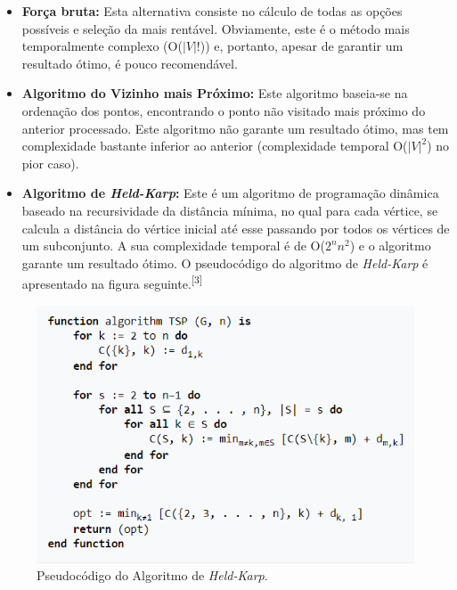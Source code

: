 \documentclass[article, a4paper, 12pt, oneside]{memoir}
\begin{document}
\begin{itemize}
\item \textbf{Força bruta:} Esta alternativa consiste no cálculo de todas as opções possíveis e seleção da mais rentável. Obviamente, este é o método mais temporalmente complexo (O($|V|!$)) e, portanto, apesar de garantir um resultado ótimo, é pouco recomendável.

\item \textbf{Algoritmo do Vizinho mais Próximo:} Este algoritmo baseia-se na ordenação dos pontos, encontrando o ponto não visitado mais próximo do anterior processado. Este algoritmo não garante um resultado ótimo, mas tem complexidade bastante inferior ao anterior (complexidade temporal O($|V|^2$) no pior caso).\\

\item \textbf{Algoritmo de \textit{Held-Karp}:} Este é um algoritmo de programação dinâmica baseado na recursividade da distância mínima, no qual para cada vértice, se calcula a distância do vértice inicial até esse passando por todos os vértices de um subconjunto. A sua complexidade temporal é de O($2^n n^2$) e o algoritmo garante um resultado ótimo. O pseudocódigo do algoritmo de \textit{Held-Karp} é apresentado na figura seguinte.\textsuperscript{[3]}
\end{itemize}

\begin{figure}[h!]
  \centerline{\includegraphics[scale=1]{Held-Karp Algorithm.PNG}}
  \caption{Pseudocódigo do Algoritmo de \textit{Held-Karp}.}
\end{figure}

\newpage
\end{document}
